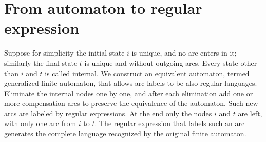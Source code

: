 \section{From automaton to regular expression}

Suppose for simplicity the initial state $i$ is unique, and no arc enters in it; similarly the final state $t$ is unique and without outgoing arcs. 
Every state other than $i$ and $t$ is called internal. 
We construct an equivalent automaton, termed generalized finite automaton,  that allows arc labels to be also regular languages. 
Eliminate the internal nodes one by one, and after each elimination add one or more compensation arcs to preserve the equivalence of the automaton.
Such new arcs are labeled by regular expressions.
At the end only the nodes $i$ and $t$ are left, with only one arc from $i$ to $t$. 
The regular expression that labels such an arc generates the complete language recognized by the original finite automaton. 

